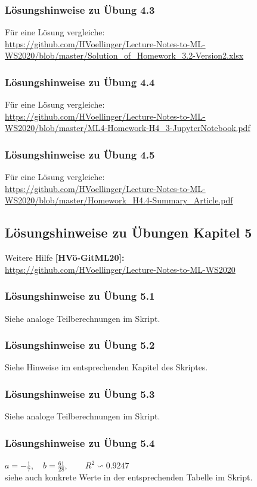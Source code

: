 \documentclass[12pt]{article}
\begin{document}
\subsubsection{Lösungshinweise zu Übung 4.3}
%
Für eine Lösung vergleiche:\\
\url{https://github.com/HVoellinger/Lecture-Notes-to-ML-WS2020/blob/master/Solution_of_Homework_3.2-Version2.xlsx}
%
\subsubsection{Lösungshinweise zu Übung 4.4}
%
Für eine Lösung vergleiche:\\
\url{https://github.com/HVoellinger/Lecture-Notes-to-ML-WS2020/blob/master/ML4-Homework-H4_3-JupyterNotebook.pdf}
%
\subsubsection{Lösungshinweise zu Übung 4.5}
%
Für eine Lösung vergleiche:\\
\url{https://github.com/HVoellinger/Lecture-Notes-to-ML-WS2020/blob/master/Homework_H4.4-Summary_Article.pdf}
%
\newpage

\subsection{Lösungshinweise zu Übungen Kapitel 5}
%
\hspace*{0.1cm} Weitere Hilfe \textbf{[HVö-GitML20]:}\\ 
\url{https://github.com/HVoellinger/Lecture-Notes-to-ML-WS2020}
%
\subsubsection{Lösungshinweise zu Übung 5.1}
%
Siehe analoge Teilberechnungen im Skript.
%
\subsubsection{Lösungshinweise zu Übung 5.2}
%
Siehe Hinweise im entsprechenden Kapitel des Skriptes.  
%
\subsubsection{Lösungshinweise zu Übung 5.3}
%
Siehe analoge Teilberechnungen im Skript.
%
\subsubsection{Lösungshinweise zu Übung 5.4}
%
$ a = - \frac{1}{7}, \quad b =  \frac{61}{28}, \qquad R^2 \backsim 0.9247 $\\[0.2cm]
siehe auch konkrete Werte in der entsprechenden Tabelle im Skript.
%
\end{document}
